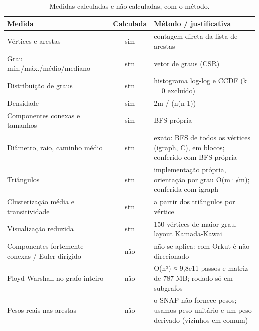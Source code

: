 \begin{table}[ht]
\centering
\caption{Medidas calculadas e não calculadas, com o método.}
\label{tab:calculadas}
\small
\begin{tabular}{lcp{8cm}}
\hline
Medida & Calculada & Método / justificativa \\
\hline
Vértices e arestas & sim & contagem direta da lista de arestas \\
Grau mín./máx./médio/mediano & sim & vetor de graus (CSR) \\
Distribuição de graus & sim & histograma log-log e CCDF (k = 0 excluído) \\
Densidade & sim & 2m / (n(n-1)) \\
Componentes conexas e tamanhos & sim & BFS própria \\
Diâmetro, raio, caminho médio & sim & exato: BFS de todos os vértices (igraph, C), em blocos; conferido com BFS própria \\
Triângulos & sim & implementação própria, orientação por grau O(m·√m); conferida com igraph \\
Clusterização média e transitividade & sim & a partir dos triângulos por vértice \\
Visualização reduzida & sim & 150 vértices de maior grau, layout Kamada-Kawai \\
Componentes fortemente conexas / Euler dirigido & não & não se aplica: com-Orkut é não direcionado \\
Floyd-Warshall no grafo inteiro & não & O(n³) ≈ 9,8e11 passos e matriz de 787 MB; rodado só em subgrafos \\
Pesos reais nas arestas & não & o SNAP não fornece pesos; usamos peso unitário e um peso derivado (vizinhos em comum) \\
\hline
\end{tabular}
\end{table}
